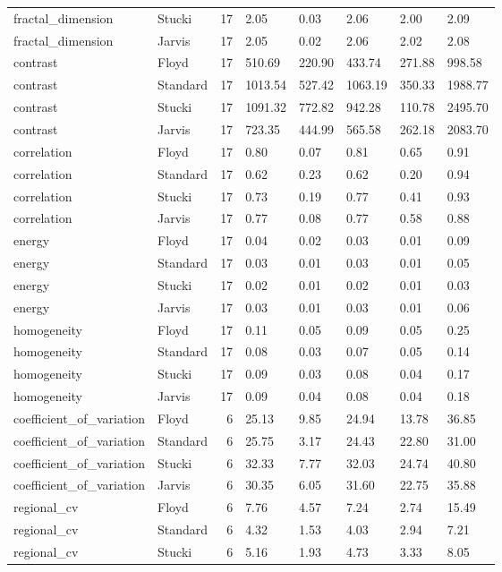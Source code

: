 \begin{tabular}{llrlllll}
fractal_dimension & Stucki & 17 & 2.05 & 0.03 & 2.06 & 2.00 & 2.09 \\
fractal_dimension & Jarvis & 17 & 2.05 & 0.02 & 2.06 & 2.02 & 2.08 \\
contrast & Floyd & 17 & 510.69 & 220.90 & 433.74 & 271.88 & 998.58 \\
contrast & Standard & 17 & 1013.54 & 527.42 & 1063.19 & 350.33 & 1988.77 \\
contrast & Stucki & 17 & 1091.32 & 772.82 & 942.28 & 110.78 & 2495.70 \\
contrast & Jarvis & 17 & 723.35 & 444.99 & 565.58 & 262.18 & 2083.70 \\
correlation & Floyd & 17 & 0.80 & 0.07 & 0.81 & 0.65 & 0.91 \\
correlation & Standard & 17 & 0.62 & 0.23 & 0.62 & 0.20 & 0.94 \\
correlation & Stucki & 17 & 0.73 & 0.19 & 0.77 & 0.41 & 0.93 \\
correlation & Jarvis & 17 & 0.77 & 0.08 & 0.77 & 0.58 & 0.88 \\
energy & Floyd & 17 & 0.04 & 0.02 & 0.03 & 0.01 & 0.09 \\
energy & Standard & 17 & 0.03 & 0.01 & 0.03 & 0.01 & 0.05 \\
energy & Stucki & 17 & 0.02 & 0.01 & 0.02 & 0.01 & 0.03 \\
energy & Jarvis & 17 & 0.03 & 0.01 & 0.03 & 0.01 & 0.06 \\
homogeneity & Floyd & 17 & 0.11 & 0.05 & 0.09 & 0.05 & 0.25 \\
homogeneity & Standard & 17 & 0.08 & 0.03 & 0.07 & 0.05 & 0.14 \\
homogeneity & Stucki & 17 & 0.09 & 0.03 & 0.08 & 0.04 & 0.17 \\
homogeneity & Jarvis & 17 & 0.09 & 0.04 & 0.08 & 0.04 & 0.18 \\
coefficient_of_variation & Floyd & 6 & 25.13 & 9.85 & 24.94 & 13.78 & 36.85 \\
coefficient_of_variation & Standard & 6 & 25.75 & 3.17 & 24.43 & 22.80 & 31.00 \\
coefficient_of_variation & Stucki & 6 & 32.33 & 7.77 & 32.03 & 24.74 & 40.80 \\
coefficient_of_variation & Jarvis & 6 & 30.35 & 6.05 & 31.60 & 22.75 & 35.88 \\
regional_cv & Floyd & 6 & 7.76 & 4.57 & 7.24 & 2.74 & 15.49 \\
regional_cv & Standard & 6 & 4.32 & 1.53 & 4.03 & 2.94 & 7.21 \\
regional_cv & Stucki & 6 & 5.16 & 1.93 & 4.73 & 3.33 & 8.05 \\

\end{tabular}
